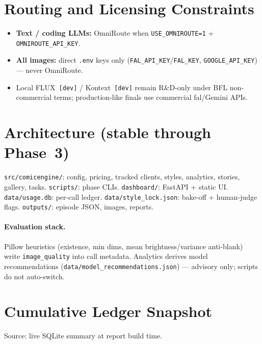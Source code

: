\documentclass[10pt,twocolumn,letterpaper]{article}
\begin{document}
\section{Routing and Licensing Constraints}
\begin{itemize}[leftmargin=*,itemsep=1pt]
  \item \textbf{Text / coding LLMs:} OmniRoute when \texttt{USE\_OMNIROUTE=1} + \texttt{OMNIROUTE\_API\_KEY}.
  \item \textbf{All images:} direct \texttt{.env} keys only (\texttt{FAL\_API\_KEY}/\texttt{FAL\_KEY}, \texttt{GOOGLE\_API\_KEY}) — never OmniRoute.
  \item Local FLUX~\texttt{[dev]} / Kontext~\texttt{[dev]} remain R\&D-only under BFL non-commercial terms; production-like finals use commercial fal/Gemini APIs.
\end{itemize}

\section{Architecture (stable through Phase~3)}
\texttt{src/comicengine/}: config, pricing, tracked clients, styles, analytics, stories, gallery, tasks.
\texttt{scripts/}: phase CLIs. \texttt{dashboard/}: FastAPI + static UI.
\texttt{data/usage.db}: per-call ledger. \texttt{data/style\_lock.json}: bake-off + human-judge flags.
\texttt{outputs/}: episode JSON, images, reports.

\paragraph{Evaluation stack.}
Pillow heuristics (existence, min dims, mean brightness/variance anti-blank) write \texttt{image\_quality} into call metadata.
Analytics derives model recommendations (\texttt{data/model\_recommendations.json}) — advisory only; scripts do not auto-switch.

\section{Cumulative Ledger Snapshot}
\label{sec:ledger}
Source: live SQLite summary at report build time.
\end{document}

